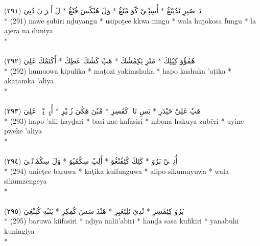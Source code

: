 \documentclass[a4paper, 12pt]{report}
\begin{document}
\begin{center}
\textarabic{(٢٩١) \textcolor{mygreen}{نَوٖ صُبِرِ نْدُيَنْڠُ  * أُسِپٗتٖيْ كّوَ مْنْڠُ  * وَلَ هُتٗكٗسَ فُنْڠُ  * لَ أَجٖرَ نَ دُنِيَ }} \\* 
(291) nawe ṣubiri nḏuyangu  * usipoṯee kkwa mngu  * wala huṯokosa fungu  * la ajera na ḏuniya  \\* 
 \\ 
\\[8mm] 

\textarabic{(٢٩٢) \textcolor{mygreen}{هُمُؤٗوَ كِپُلِكَ  * مَتٗزِ يَكِمْشُكَ  * هَپٗ كَشُكَ عَطِكَ  * أَكَتَمْكَ عَلِيَ }} \\* 
(292) humuowa kipulika  * maṯozi yakimshuka  * hapo kashuka 'aṭika  * akaṯamka 'aliya  \\* 
 \\ 
\\[8mm] 

\textarabic{(٢٩٣) \textcolor{mygreen}{هَپٗ عَلِيْ حَيْدَرِ  * بَسِ نَاءٖ كَفَسِرِ  * مْبٗنَ هَكُيَ زُبٖيْرِ  * أُيِنٖ پْوٖكٖ عَلِيَ }} \\* 
(293) hapo 'alii ḥayḏari  * basi nae kafasiri  * mbona hakuya zubēri  * uyine pweke 'aliya  \\* 
 \\ 
\\[8mm] 

\textarabic{(٢٩٤) \textcolor{mygreen}{أُنِئٖٹٖيْ بَرُوَ  * كَٹِكَ كُئِفُنْڠُوَ  * أَلِپٗ سِكُمُيُوَ  * وَلَ سِكُمْزٖنْڠٖيَ }} \\* 
(294) unieţee baruwa  * kaţika kuifunguwa  * alipo sikumuyuwa  * wala sikumzengeya  \\* 
 \\ 
\\[8mm] 

\textarabic{(٢٩٥) \textcolor{mygreen}{بَرُوَ كِئِفَسِرِ  * نْدِيَ نَلِئِعَبِرِ  * هَنْدَ سَسَ كُفِكِرِ  * يَنَبُهِ كُنِنْڠِيَ }} \\* 
(295) baruwa kiifasiri  * nḏiya nalii'abiri  * hanḏa sasa kufikiri  * yanabuhi kuningiya  \\* 
 \\ 
\\[8mm] 


\end{center}
\end{document}
